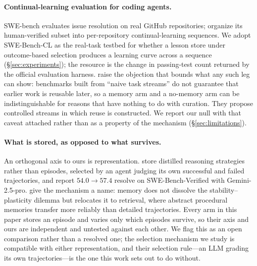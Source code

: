 \paragraph{Continual-learning evaluation for coding agents.}
SWE-bench \citep{jimenez2024swebench} evaluates issue resolution on real
GitHub repositories; \citet{joshi2025swebenchcl} organize its
human-verified subset into per-repository continual-learning sequences.
We adopt SWE-Bench-CL as the real-task testbed for whether a lesson store
under outcome-based selection produces a learning curve across a
sequence (\S\ref{sec:experiments}); the resource is the change in
passing-test count returned by the official evaluation harness.
\citet{agentcl2026} raise the objection that bounds what any such leg can
show: benchmarks built from ``naive task streams'' do not guarantee that
earlier work is reusable later, so a memory arm and a no-memory arm can
be indistinguishable for reasons that have nothing to do with curation.
They propose controlled streams in which reuse is constructed. We report
our null with that caveat attached rather than as a property of the
mechanism (\S\ref{sec:limitations}).

\paragraph{What is stored, as opposed to what survives.}
An orthogonal axis to ours is representation. \citet{reasoningbank2026}
store distilled reasoning strategies rather than episodes, selected by an
agent judging its own successful and failed trajectories, and report
$54.0 \rightarrow 57.4$ resolve on SWE-Bench-Verified with
Gemini-2.5-pro. \citet{cl2memory2026} give the mechanism a name: memory
does not dissolve the stability--plasticity dilemma but relocates it to
retrieval, where abstract procedural memories transfer more reliably than
detailed trajectories. Every arm in this paper stores an episode and
varies only which episodes survive, so their axis and ours are
independent and untested against each other. We flag this as an open
comparison rather than a resolved one; the selection mechanism we study
is compatible with either representation, and their selection rule---an
LLM grading its own trajectories---is the one this work sets out to do
without.


